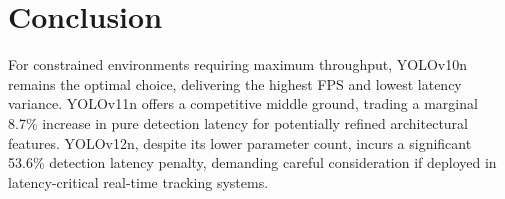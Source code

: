 \documentclass[11pt,a4paper]{article}
\begin{document}
\section{Conclusion}
For constrained environments requiring maximum throughput, YOLOv10n remains the optimal choice, delivering the highest FPS and lowest latency variance. YOLOv11n offers a competitive middle ground, trading a marginal 8.7\% increase in pure detection latency for potentially refined architectural features. YOLOv12n, despite its lower parameter count, incurs a significant 53.6\% detection latency penalty, demanding careful consideration if deployed in latency-critical real-time tracking systems.
\end{document}

